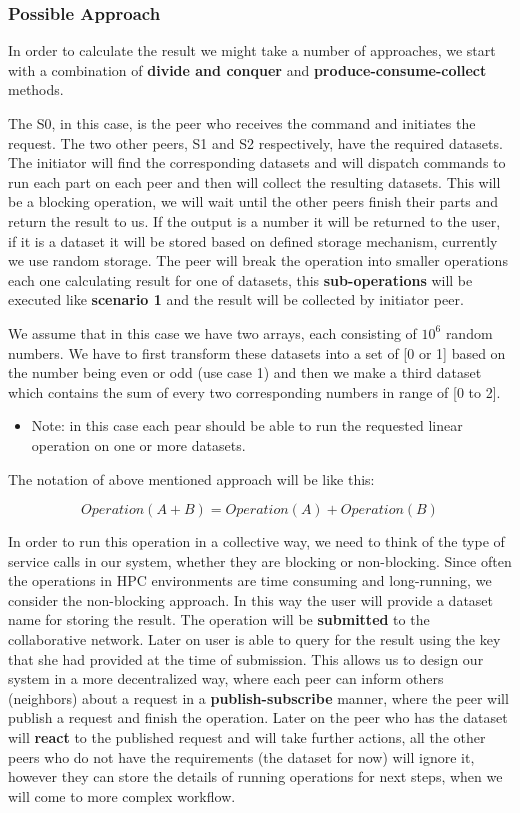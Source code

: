 \iffalse

\subsubsection{Possible Approach}
In order to calculate the result we might take a number of approaches, we start with a combination of \textbf{divide and conquer} and
\textbf{produce-consume-collect} methods.

The S0, in this case, is the peer who receives the command and initiates the request. The two other peers, S1 and S2 respectively, have the required
datasets. The initiator will find the corresponding datasets and will dispatch commands to run each part on each peer and then will collect
the resulting datasets. This will be a blocking operation, we will wait until the other peers finish their parts and return the result
to us. If the output is a number it will be returned to the user, if it is a dataset it will be stored based on defined storage mechanism, 
currently we use random storage. The peer will break the operation into smaller operations each one calculating result for one of datasets, 
this \textbf{sub-operations} will be executed like \textbf{scenario 1} and the result will be collected by initiator peer.

We assume that in this case we have two arrays, each consisting of \(10^6\) random numbers. We have to first transform these datasets into
a set of [0 or 1] based on the number being even or odd (use case 1) and then we make a third dataset which contains the sum of every two
corresponding numbers in range of [0 to 2].


\begin{itemize}
\item Note: in this case each pear should be able to run the requested linear operation on one or more datasets.
\end{itemize}

The notation of above mentioned approach will be like this:

\[ Operation(A + B) = Operation(A) + Operation(B) \]

In order to run this operation in a collective way, we need to think of the type of service calls in our system, whether they are blocking or
non-blocking. Since often the operations in HPC environments are time consuming and long-running, we consider the non-blocking approach. In
this way the user will provide a dataset name for storing the result. The operation will be \textbf{submitted} to the collaborative network.
Later on user is able to query for the result using the key that she had provided at the time of submission. This allows us to design our system
in a more decentralized way, where each peer can inform others (neighbors) about a request in a \textbf{publish-subscribe} manner, where the peer
will publish a request and finish the operation. Later on the peer who has the dataset will \textbf{react} to the published request and will take
further actions, all the other peers who do not have the requirements (the dataset for now) will ignore it, however they can store the details of 
running operations for next steps, when we will come to more complex workflow.

